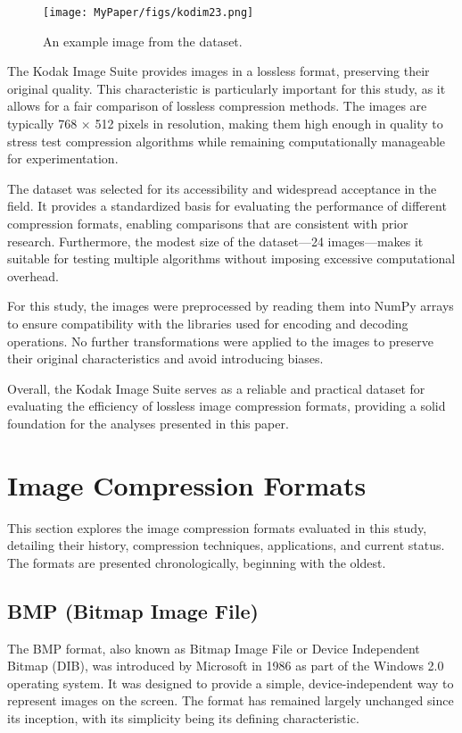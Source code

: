 \documentclass[conference]{IEEEtran}
\begin{document}
\begin{figure}[htbp]
\centering
\texttt{[image: MyPaper/figs/kodim23.png]}
\caption{An example image from the dataset.}
\label{example_img_1}
\end{figure}

The Kodak Image Suite provides images in a lossless format, preserving their original quality. This characteristic is particularly important for this study, as it allows for a fair comparison of lossless compression methods. The images are typically 768 × 512 pixels in resolution, making them high enough in quality to stress test compression algorithms while remaining computationally manageable for experimentation.

The dataset was selected for its accessibility and widespread acceptance in the field. It provides a standardized basis for evaluating the performance of different compression formats, enabling comparisons that are consistent with prior research. Furthermore, the modest size of the dataset—24 images—makes it suitable for testing multiple algorithms without imposing excessive computational overhead.

For this study, the images were preprocessed by reading them into NumPy arrays to ensure compatibility with the libraries used for encoding and decoding operations. No further transformations were applied to the images to preserve their original characteristics and avoid introducing biases.

Overall, the Kodak Image Suite serves as a reliable and practical dataset for evaluating the efficiency of lossless image compression formats, providing a solid foundation for the analyses presented in this paper.


\section{Image Compression Formats}
This section explores the image compression formats evaluated in this study, detailing their history, compression techniques, applications, and current status. The formats are presented chronologically, beginning with the oldest.

\subsection{BMP (Bitmap Image File)}
The BMP format, also known as Bitmap Image File or Device Independent Bitmap (DIB), was introduced by Microsoft in 1986 as part of the Windows 2.0 operating system. It was designed to provide a simple, device-independent way to represent images on the screen. The format has remained largely unchanged since its inception, with its simplicity being its defining characteristic.
\end{document}
